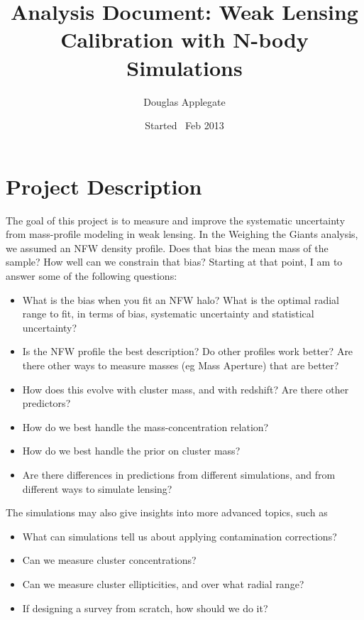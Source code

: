\documentclass[11pt]{article}
\title{Analysis Document: Weak Lensing Calibration with N-body Simulations}
\date{Started ~Feb 2013}
\author{Douglas Applegate}
\begin{document}
\maketitle

\tableofcontents


\section{Project Description}

The goal of this project is to measure and improve the systematic uncertainty from mass-profile modeling in weak lensing. In the Weighing the Giants analysis, we assumed an NFW density profile. Does that bias the mean mass of the sample? How well can we constrain that bias? Starting at that point, I am to answer some of the following questions:

\begin{itemize}
\item What is the bias when you fit an NFW halo? What is the optimal radial range to fit, in terms of bias, systematic uncertainty and statistical uncertainty?
\item Is the NFW profile the best description? Do other profiles work better? Are there other ways to measure masses (eg Mass Aperture) that are better?
\item How does this evolve with cluster mass, and with redshift? Are there other predictors?
\item How do we best handle the mass-concentration relation?
\item How do we best handle the prior on cluster mass?
\item Are there differences in predictions from different simulations, and from different ways to simulate lensing?
\end{itemize}

The simulations may also give insights into more advanced topics, such as 
\begin{itemize}
\item What can simulations tell us about applying contamination corrections?
\item Can we measure cluster concentrations?
\item Can we measure cluster ellipticities, and over what radial range?
\item If designing a survey from scratch, how should we do it?
\end{itemize}
\end{document}
